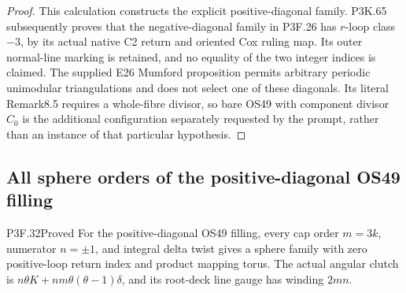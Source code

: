 \begin{proof}
This calculation constructs the explicit positive-diagonal family. P3K.65 subsequently proves that the negative-diagonal family in P3F.26 has \(r\)-loop class \(-3\), by its actual native C2 return and oriented Cox ruling map. Its outer normal-line marking is retained, and no equality of the two integer indices is claimed. The supplied E26 Mumford proposition permits arbitrary periodic unimodular triangulations and does not select one of these diagonals. Its literal Remark8.5 requires a whole-fibre divisor, so bare OS49 with component divisor \(C_0\) is the additional configuration separately requested by the prompt, rather than an instance of that particular hypothesis.
\end{proof}
\subsection{All sphere orders of the positive-diagonal OS49 filling}
\begin{statement}{P3F.32}{Proved}
For the positive-diagonal OS49 filling, every cap order $m=3k$, numerator $n=\pm1$, and integral delta twist gives a sphere family with zero positive-loop return index and product mapping torus. The actual angular clutch is $n\theta K+nm\theta(\theta-1)\delta$, and its root-deck line gauge has winding $2mn$.
\end{statement}
